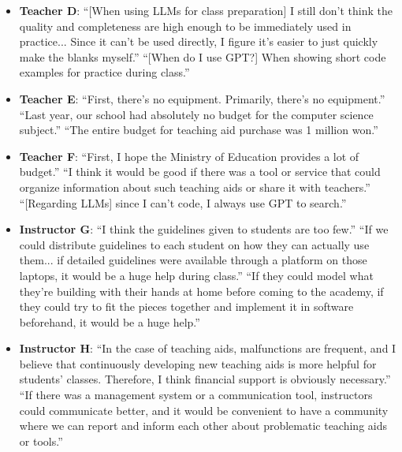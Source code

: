 \documentclass{article} %
\begin{document}
\begin{summarybox}
\begin{itemize}[itemsep=0em, topsep=0.5em, labelsep=0.5em, leftmargin=0.5em]
    \item \textbf{Teacher D}: ``[When using LLMs for class preparation] I still don't think the quality and completeness are high enough to be immediately used in practice... Since it can't be used directly, I figure it's easier to just quickly make the blanks myself.''  ``[When do I use GPT?] When showing short code examples for practice during class.''
    \item \textbf{Teacher E}: ``First, there's no equipment. Primarily, there's no equipment.''  ``Last year, our school had absolutely no budget for the computer science subject.''  ``The entire budget for teaching aid purchase was 1 million won.''
    \item \textbf{Teacher F}: ``First, I hope the Ministry of Education provides a lot of budget.''  ``I think it would be good if there was a tool or service that could organize information about such teaching aids or share it with teachers.''  ``[Regarding LLMs] since I can't code, I always use GPT to search.''
    \item \textbf{Instructor G}: ``I think the guidelines given to students are too few.''  ``If we could distribute guidelines to each student on how they can actually use them... if detailed guidelines were available through a platform on those laptops, it would be a huge help during class.''  ``If they could model what they're building with their hands at home before coming to the academy, if they could try to fit the pieces together and implement it in software beforehand, it would be a huge help.'' 
    \item \textbf{Instructor H}: ``In the case of teaching aids, malfunctions are frequent, and I believe that continuously developing new teaching aids is more helpful for students' classes. Therefore, I think financial support is obviously necessary.''  ``If there was a management system or a communication tool, instructors could communicate better, and it would be convenient to have a community where we can report and inform each other about problematic teaching aids or tools.''
\end{itemize}
\end{summarybox}

\vspace{1em}
\end{document}
